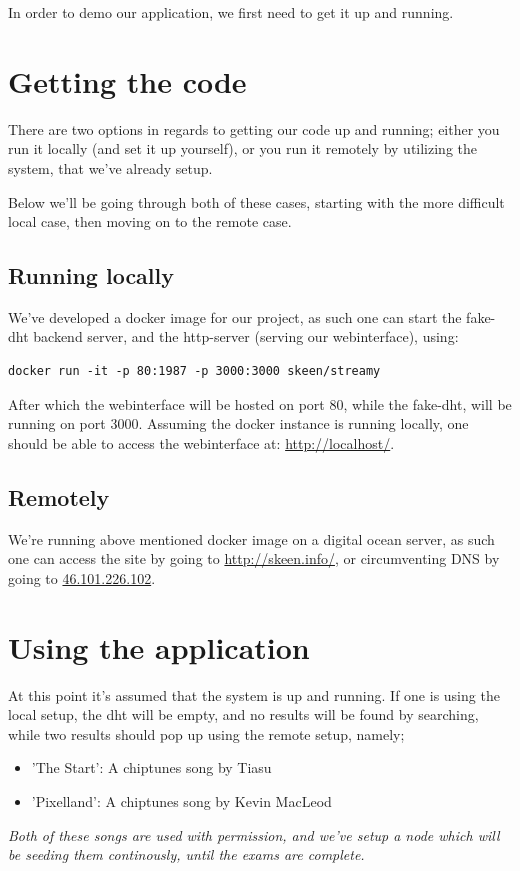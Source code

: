 In order to demo our application, we first need to get it up and running.

\section{Getting the code}
There are two options in regards to getting our code up and running; either you
run it locally (and set it up yourself), or you run it remotely by utilizing
the system, that we've already setup.

Below we'll be going through both of these cases, starting with the more 
difficult local case, then moving on to the remote case.

\subsection{Running locally}
We've developed a docker image for our project, as such one can start the 
fake-dht backend server, and the http-server (serving our webinterface), using:
\begin{verbatim}
docker run -it -p 80:1987 -p 3000:3000 skeen/streamy
\end{verbatim}
After which the webinterface will be hosted on port 80, while the fake-dht,
will be running on port 3000. Assuming the docker instance is running locally,
one should be able to access the webinterface at: \url{http://localhost/}.

\subsection{Remotely}
\label{subsec:running-remotely}
We're running above mentioned docker image on a digital ocean server, as such
one can access the site by going to \url{http://skeen.info/}, or circumventing
DNS by going to \url{46.101.226.102}.

\section{Using the application}
At this point it's assumed that the system is up and running. If one is using 
the local setup, the dht will be empty, and no results will be found by
searching, while two results should pop up using the remote setup, namely;
\begin{itemize}
\item 'The Start': A chiptunes song by Tiasu
\item 'Pixelland': A chiptunes song by Kevin MacLeod
\end{itemize}
{\em Both of these songs are used with permission, and we've setup a node which will
be seeding them continously, until the exams are complete.}

